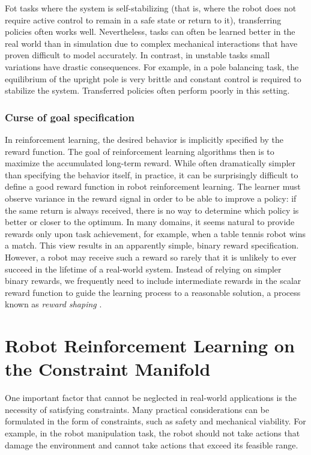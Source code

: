 Fot tasks where the system is self-stabilizing (that is, where the robot does not require active control to remain in a safe state or return to it),
transferring policies often works well. Nevertheless, tasks can often be learned better in the real world than in simulation due to complex mechanical interactions
that have proven difficult to model accurately. In contrast, in unstable tasks small variations have drastic consequences. For example, in a pole balancing
task, the equilibrium of the upright pole is very brittle and constant control is required to stabilize the system. Transferred policies often perform poorly
in this setting.

\subsubsection{Curse of goal specification}
In reinforcement learning, the desired behavior is implicitly specified by the reward function. The goal of reinforcement
learning algorithms then is to maximize the accumulated long-term reward. While often dramatically simpler than
specifying the behavior itself, in practice, it can be surprisingly difficult to define a good reward function in robot
reinforcement learning. The learner must observe variance in the reward signal in order to be able to improve a
policy: if the same return is always received, there is no way to determine which policy is better or closer to the
optimum. In many domains, it seems natural to provide rewards only upon task achievement, for example, when a table tennis
robot wins a match. This view results in an apparently simple, binary reward specification. However, a robot may
receive such a reward so rarely that it is unlikely to ever succeed in the lifetime of a real-world system. Instead of
relying on simpler binary rewards, we frequently need to include intermediate rewards in the scalar reward function
to guide the learning process to a reasonable solution, a process known as \textit{reward shaping} \cite{Laud2004}.

\section{Robot Reinforcement Learning on the Constraint Manifold}
One important factor that cannot be neglected in real-world applications is the necessity of satisfying constraints.
Many practical considerations can be formulated in the form of constraints, such as safety and mechanical viability. For example,
in the robot manipulation task, the robot should not take actions that damage the environment and cannot take actions that exceed
its feasible range.


